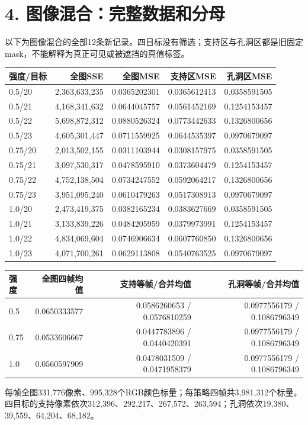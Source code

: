 \documentclass[UTF8,10pt,a4paper]{ctexart}
\begin{document}
\section*{4. 图像混合：完整数据和分母}
以下为图像混合的全部12条新记录。四目标没有筛选；支持区与孔洞区都是旧固定mask，不能解释为真正可见或被遮挡的真值标签。
\begin{center}\small\begin{tabular}{lrrrr}\toprule
强度/目标 & 全图SSE & 全图MSE & 支持区MSE & 孔洞区MSE\\\midrule
0.5/20 & 2,363,633,235 & 0.0365202301 & 0.0365612413 & 0.0358591505\\
0.5/21 & 4,168,341,632 & 0.0644045757 & 0.0561452169 & 0.1254153457\\
0.5/22 & 5,698,872,312 & 0.0880526324 & 0.0773442633 & 0.1326800656\\
0.5/23 & 4,605,301,447 & 0.0711559925 & 0.0644535397 & 0.0970679097\\
0.75/20 & 2,013,502,155 & 0.0311103944 & 0.0308157975 & 0.0358591505\\
0.75/21 & 3,097,530,317 & 0.0478595910 & 0.0373604479 & 0.1254153457\\
0.75/22 & 4,752,138,504 & 0.0734247552 & 0.0592064217 & 0.1326800656\\
0.75/23 & 3,951,095,240 & 0.0610479263 & 0.0517308913 & 0.0970679097\\
1.0/20 & 2,473,419,375 & 0.0382165234 & 0.0383627669 & 0.0358591505\\
1.0/21 & 3,133,839,226 & 0.0484205959 & 0.0379973991 & 0.1254153457\\
1.0/22 & 4,834,069,604 & 0.0746906634 & 0.0607760850 & 0.1326800656\\
1.0/23 & 4,071,700,261 & 0.0629113808 & 0.0540763525 & 0.0970679097\\
\bottomrule\end{tabular}\end{center}
\begin{center}\small\begin{tabular}{lrrr}\toprule
强度 & 全图四帧均值 & 支持等帧/合并均值 & 孔洞等帧/合并均值\\\midrule
0.5 & 0.0650333577 & 0.0586260653 / 0.0576810259 & 0.0977556179 / 0.1086796349\\
0.75 & 0.0533606667 & 0.0447783896 / 0.0440420391 & 0.0977556179 / 0.1086796349\\
1.0 & 0.0560597909 & 0.0478031509 / 0.0471958379 & 0.0977556179 / 0.1086796349\\
\bottomrule\end{tabular}\end{center}
每帧全图331,776像素、995,328个RGB颜色标量；每策略四帧共3,981,312个标量。四目标的支持像素依次312,396、292,217、267,572、263,594；孔洞依次19,380、39,559、64,204、68,182。
\end{document}
